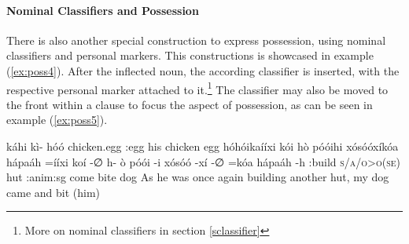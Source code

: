 \documentclass[a4paper, 12pt, oneside]{memoir}
\begin{document}
\paragraph{Nominal Classifiers and Possession}\label{snomclassifiersandpossession}
There is also another special construction to express possession, using nominal classifiers and personal markers. This constructions is showcased in example (\ref{ex:poss4}). After the inflected noun, the according classifier is inserted, with the respective personal marker attached to it.\footnote{More on nominal classifiers in section \ref{sclassifier}} 
The classifier may also be moved to the front within a clause to focus the aspect of possession, as can be seen in example (\ref{ex:poss5}).
\begin{examples}
\ex
\label{ex:poss4}
\bits káhi kì- hóó
\gloss chicken.egg {\Tsposs} {\Cl}:egg  
\tr his chicken egg
\ex
\label{ex:poss5}
\words hóhóikaííxi kói hò póóihi xósóóxíkóa hápaáh
 =ííxi koí -∅ h- ò póói -i xósóó -xí -∅ =kóa hápaáh -h 
\gloss {\Redup}:build \textsc{s/a/o>o(se)} hut {\Abs} {\Fsposs} {\Cl}:anim:sg come {\Dep} bite {\Rpasto} {\St} {\Decl} dog {\Erg} 
\tr As he was once again building another hut, my dog came and bit (him)
\end{examples}
\end{document}
